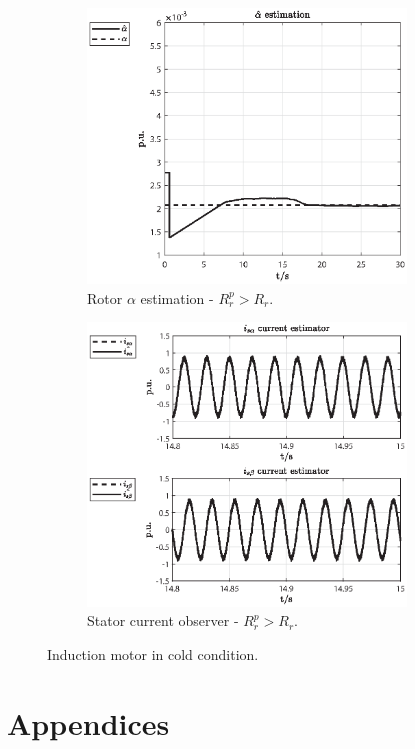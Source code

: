 \documentclass[11pt,a4paper,oneside]{book}
\numberwithin{equation}{section}
\theoremstyle{it}
\theoremstyle{definition}
\begin{document}
\begin{figure}[H]
	\centering
	\begin{subfigure}{0.5\textwidth}
	\centering
	\includegraphics[width = 240pt, keepaspectratio]{figures/sim_results/cold_condition/alpha_est.eps}
	\captionsetup{width=0.65\textwidth, font=footnotesize}		
	\caption{Rotor ${\alpha}$ estimation - $R_r^p > R_r$.}
	\label{fig_sim_res_23}
	\end{subfigure}%
	\begin{subfigure}{0.5\textwidth}
	\centering
	\includegraphics[width = 240pt, keepaspectratio]{figures/sim_results/cold_condition/current_obs.eps}
	\captionsetup{width=0.65\textwidth, font=footnotesize}		
	\caption{Stator current observer - $R_r^p > R_r$.}
	\label{fig_sim_res_24}
	\end{subfigure}		
	\captionsetup{width=0.5\textwidth, font=small}	
	\caption{Induction motor in cold condition.}
	\label{}
\end{figure}

\chapter{Appendices}
\end{document}

